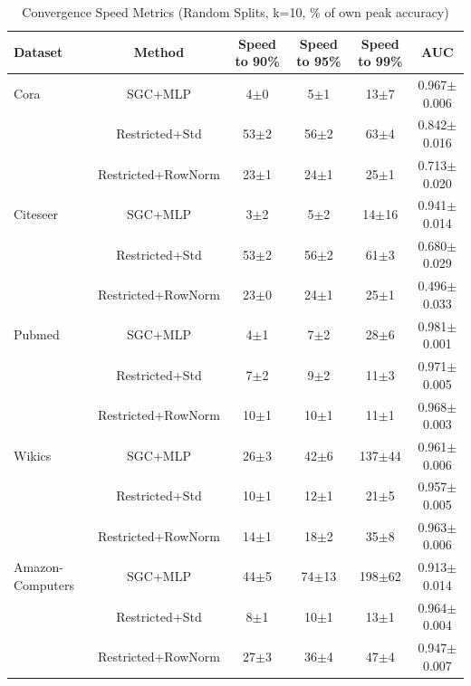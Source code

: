 \begin{table}[t]
\centering
\caption{Convergence Speed Metrics (Random Splits, k=10, \% of own peak accuracy)}
\label{tab:convergence_speed_random}
\begin{tabular}{lccccc}
\toprule
\textbf{Dataset} & \textbf{Method} & \textbf{Speed to 90\%} & \textbf{Speed to 95\%} & \textbf{Speed to 99\%} & \textbf{AUC} \\
\midrule
Cora                 & SGC+MLP                   & 4$\pm$0 & 5$\pm$1 & 13$\pm$7 & 0.967$\pm$0.006 \\
                     & Restricted+Std            & 53$\pm$2 & 56$\pm$2 & 63$\pm$4 & 0.842$\pm$0.016 \\
                     & Restricted+RowNorm        & 23$\pm$1 & 24$\pm$1 & 25$\pm$1 & 0.713$\pm$0.020 \\
\midrule
Citeseer             & SGC+MLP                   & 3$\pm$2 & 5$\pm$2 & 14$\pm$16 & 0.941$\pm$0.014 \\
                     & Restricted+Std            & 53$\pm$2 & 56$\pm$2 & 61$\pm$3 & 0.680$\pm$0.029 \\
                     & Restricted+RowNorm        & 23$\pm$0 & 24$\pm$1 & 25$\pm$1 & 0.496$\pm$0.033 \\
\midrule
Pubmed               & SGC+MLP                   & 4$\pm$1 & 7$\pm$2 & 28$\pm$6 & 0.981$\pm$0.001 \\
                     & Restricted+Std            & 7$\pm$2 & 9$\pm$2 & 11$\pm$3 & 0.971$\pm$0.005 \\
                     & Restricted+RowNorm        & 10$\pm$1 & 10$\pm$1 & 11$\pm$1 & 0.968$\pm$0.003 \\
\midrule
Wikics               & SGC+MLP                   & 26$\pm$3 & 42$\pm$6 & 137$\pm$44 & 0.961$\pm$0.006 \\
                     & Restricted+Std            & 10$\pm$1 & 12$\pm$1 & 21$\pm$5 & 0.957$\pm$0.005 \\
                     & Restricted+RowNorm        & 14$\pm$1 & 18$\pm$2 & 35$\pm$8 & 0.963$\pm$0.006 \\
\midrule
Amazon-Computers     & SGC+MLP                   & 44$\pm$5 & 74$\pm$13 & 198$\pm$62 & 0.913$\pm$0.014 \\
                     & Restricted+Std            & 8$\pm$1 & 10$\pm$1 & 13$\pm$1 & 0.964$\pm$0.004 \\
                     & Restricted+RowNorm        & 27$\pm$3 & 36$\pm$4 & 47$\pm$4 & 0.947$\pm$0.007 \\

\end{tabular}
\end{table}

